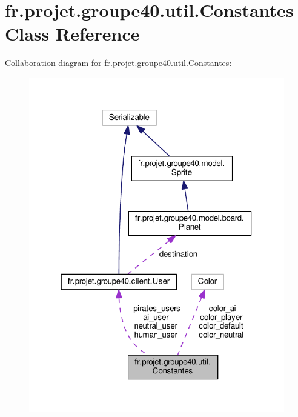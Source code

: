 \hypertarget{classfr_1_1projet_1_1groupe40_1_1util_1_1_constantes}{}\section{fr.\+projet.\+groupe40.\+util.\+Constantes Class Reference}
\label{classfr_1_1projet_1_1groupe40_1_1util_1_1_constantes}


Collaboration diagram for fr.\+projet.\+groupe40.\+util.\+Constantes\+:\nopagebreak
\begin{figure}[H]
\begin{center}
\leavevmode
\includegraphics[width=316pt]{classfr_1_1projet_1_1groupe40_1_1util_1_1_constantes__coll__graph}
\end{center}
\end{figure}
